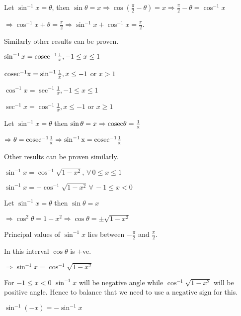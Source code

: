 \startproof
  Let $\sin^{-1}x = \theta$, then $\sin\theta = x \Rightarrow \cos\left(\frac{\pi}{2} - \theta\right) = x \Rightarrow \frac{\pi}{2}
  - \theta = \cos^{-1}x$

  $\Rightarrow \cos^{-1}x + \theta = \frac{\pi}{2} \Rightarrow \sin^{-1}x + \cos^{-1}x = \frac{\pi}{2}$.

  Similarly other results can be proven.
\stopproof

\starttheorem
  \startitemize[n]
  \item $\sin^{-1}x = {\rm cosec}^{-1}\frac{1}{x}, -1\leq x\leq 1$
  \item ${\rm cosec^{-1}x} = \sin^{-1}\frac{1}{x}, x\leq -1$ or $x > 1$
  \item $\cos^{-1}x = \sec^{-1}\frac{1}{x}, -1\leq x\leq 1$
  \item $\sec^{-1}x = \cos^{-1}\frac{1}{x}, x\leq -1$ or $x\geq 1$
  \stopitemize
\stoptheorem

\startproof
  Let $\sin^{-1}x = \theta$ then $\sin\theta = x \Rightarrow \rm cosec\theta = \frac{1}{x}$

  $\Rightarrow \theta = \rm cosec^{-1}\frac{1}{x} \Rightarrow \sin^{-1}x = \rm cosec^{-1}\frac{1}{x}$

  Other results can be proven similarly.
\stopproof

\starttheorem
  \startitemize[n]
    \item $\sin^{-1}x = \cos^{-1}\sqrt{1 - x^2}, \,\forall\,0\leq x\leq 1$

    \item $\sin^{-1}x = -\cos^{-1}\sqrt{1 - x^2}\,\forall\,-1\leq x< 0$
  \stopitemize
\stoptheorem

\startproof
  Let $\sin^{-1}x = \theta$ then $\sin\theta = x$

  $\Rightarrow \cos^2\theta = 1 - x^2 \Rightarrow \cos\theta = \pm\sqrt{1 - x^2}$

  Principal values of $\sin^{-1}x$ lies between $-\frac{\pi}{2}$ and $\frac{\pi}{2}$.

  In this interval $\cos\theta$ is $+$ve.

  $\Rightarrow \sin^{-1}x = \cos^{-1}\sqrt{1 - x^2}$

  For $-1\leq x < 0$ $\sin^{-1}x$ will be negative angle while $\cos^{-1}\sqrt{1 - x^2}$ will be positive
  angle. Hence to balance that we need to use a negative sign for this.
\stopproof

\starttheorem
  \startitemize[n]
    \item $\sin^{-1}(-x) = -\sin^{-1}x$

